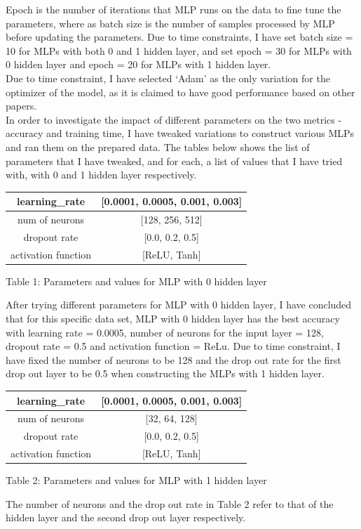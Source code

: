 \documentclass[letterpaper, 12 pt, conference]{ieeeconf}  %
\begin{document}
Epoch is the number of iterations that MLP runs on the data to fine tune the parameters, where as batch size is the number of samples processed by MLP before updating the parameters. Due to time constraints, I have set batch size = 10 for MLPs with both 0 and 1 hidden layer, and set epoch = 30 for MLPs with 0 hidden layer and epoch = 20 for MLPs with 1 hidden layer.\\
\newline
Due to time constraint, I have selected `Adam' as the only variation for the optimizer of the model, as it is claimed to have good performance based on other papers.\\\newline
In order to investigate the impact of different parameters on the two metrics - accuracy and training time, I have tweaked variations to construct various MLPs and ran them on the prepared data. The tables below shows the list of parameters that I have tweaked, and for each, a list of values that I have tried with, with 0 and 1 hidden layer respectively.  
\begin{center}
 \begin{tabular}{||c| c||} 
 \hline
 learning\_rate &  [0.0001, 0.0005, 0.001, 0.003]\\
 \hline
 num of neurons & [128, 256, 512] \\
 \hline
 dropout rate & [0.0, 0.2, 0.5]\\
 \hline
 activation function & [ReLU, Tanh]\\ 
 \hline
\end{tabular}
Table 1: Parameters and values for MLP with 0 hidden layer
\end{center}
After trying different parameters for MLP with 0 hidden layer, I have concluded that for this specific data set, MLP with 0 hidden layer has the best accuracy with learning rate = 0.0005, number of neurons for the input layer = 128, dropout rate = 0.5 and activation function = ReLu. Due to time constraint, I have fixed the number of neurons to be 128 and the drop out rate for the first drop out layer to be 0.5 when constructing the MLPs with 1 hidden layer. \\
\begin{center}
 \begin{tabular}{||c| c||} 
 \hline
 learning\_rate &  [0.0001, 0.0005, 0.001, 0.003]\\
 \hline
 num of neurons & [32, 64, 128] \\
 \hline
 dropout rate & [0.0, 0.2, 0.5]\\
 \hline
 activation function & [ReLU, Tanh]\\ 
 \hline
\end{tabular}
Table 2: Parameters and values for MLP with 1 hidden layer
\end{center}
The number of neurons and the drop out rate in Table 2 refer to that of the hidden layer and the second drop out layer respectively. 
\end{document}
